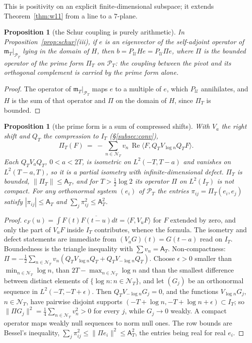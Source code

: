\documentclass[11pt]{amsart}
\newtheorem{proposition}[theorem]{Proposition}
\theoremstyle{definition}
\theoremstyle{remark}
\newcommand{\Rel}{\operatorname{Re}}
\newcommand{\PT}{\mathcal P_T}
\newcommand{\IT}{I_T}
\newcommand{\cF}{c_F}
\newcommand{\NT}{\mathcal N_T}
\newcommand{\Aconst}{\mathsf A_T}
\newcommand{\PiT}{\Pi_T}
\newcommand{\mT}{\mathfrak m_T}
\begin{document}
This is positivity on an explicit finite-dimensional subspace; it extends Theorem~\ref{thm:w11} from a line
to a $7$-plane.

\begin{proposition}[the Schur coupling is purely arithmetic]\label{prop:bprime}
In Proposition~\ref{prop:schur}(iii), if $e$ is an eigenvector of the self-adjoint operator of $\mT|_{\PT}$ lying in
the domain of $H$, then $b=P_{\mathcal U}He=P_{\mathcal U}\Pi e$, where $\Pi$ is the bounded operator of the prime form
$\PiT$ on $\PT$: the coupling between the pivot and its orthogonal complement is carried by the prime form alone.
\end{proposition}
\begin{proof}
The operator of $\mT|_{\PT}$ maps $e$ to a multiple of $e$, which $P_{\mathcal U}$ annihilates, and $H$ is the sum of
that operator and $\Pi$ on the domain of $H$, since $\PiT$ is bounded.
\end{proof}

\begin{proposition}[the prime form is a sum of compressed shifts]\label{prop:shifts}
With $V_a$ the right shift and $Q_T$ the compression to $\IT$ (\S\ref{subsec:conv}),
\[
\PiT(F)\ =\ -\sum_{n\in\NT}v_n\,\Rel\big\langle F,Q_TV_{\log n}Q_TF\big\rangle .
\]
Each $Q_TV_aQ_T$, $0<a<2T$, is isometric on $L^2(-T,T-a)$ and vanishes on $L^2(T-a,T)$, so it is a partial isometry
with infinite-dimensional defect. $\PiT$ is bounded, $\|\PiT\|\le\Aconst$, and for $T>\frac12\log2$ its
operator $\Pi$ on $L^2(\IT)$ is not compact. For any orthonormal system $(e_i)$ of $\PT$ the entries
$\pi_{ij}=\PiT(e_i,e_j)$ satisfy $|\pi_{ij}|\le\Aconst$ and $\sum_j\pi_{ij}^2\le\Aconst^2$.
\end{proposition}
\begin{proof}
$\cF(u)=\int F(t)\overline{F(t-u)}dt=\langle F,V_uF\rangle$ for $F$ extended by zero, and only the part of $V_uF$ inside
$\IT$ contributes, whence the formula. The isometry and defect statements are immediate from $(V_aG)(t)=G(t-a)$ read
on $\IT$. Boundedness is the triangle inequality with $\sum v_n=\Aconst$. Non-compactness: $\Pi=-\frac12\sum_{n\in\NT}v_n
(Q_TV_{\log n}Q_T+Q_TV_{-\log n}Q_T)$. Choose $\epsilon>0$ smaller than $\min_{n\in\NT}\log n$, than $2T-\max_{n\in\NT}\log n$
and than the smallest difference between distinct elements of $\{\log n:n\in\NT\}$, and let $(G_j)$ be an orthonormal
sequence in $L^2(-T,-T+\epsilon)$. Then $Q_TV_{-\log n}G_j=0$, and the functions $V_{\log n}G_j$, $n\in\NT$, have pairwise
disjoint supports $(-T+\log n,-T+\log n+\epsilon)\subset\IT$; so $\|\Pi G_j\|^2=\frac14\sum_{n\in\NT}v_n^2>0$ for every $j$,
while $G_j\to0$ weakly. A compact operator maps weakly null sequences to norm null ones. The row bounds are Bessel's
inequality, $\sum_j\pi_{ij}^2\le\|\Pi e_i\|^2\le\Aconst^2$, the entries being real for real $e_i$.
\end{proof}
\end{document}
